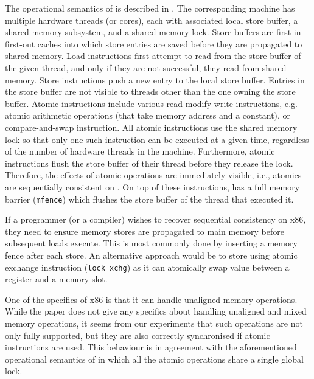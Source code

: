 The operational semantics of \xtso is described in .
The corresponding machine has multiple hardware threads (or cores), each with
associated local store buffer, a shared memory subsystem, and a shared memory
lock.
Store buffers are first-in-first-out caches into which store entries are saved
before they are propagated to shared memory.
Load instructions first attempt to read from the store buffer of the given
thread, and only if they are not successful, they read from shared memory.
Store instructions push a new entry to the local store buffer.
Entries in the store buffer are not visible to threads other than the one
owning the store buffer.
Atomic instructions include various read-modify-write instructions, e.g. atomic
arithmetic operations (that take memory address and a constant),
or compare-and-swap instruction.
All atomic instructions use the shared memory lock so that only one such
instruction can be executed at a given time, regardless of the number of
hardware threads in the machine.
Furthermore, atomic instructions flush the store buffer of their thread before
they release the lock.
Therefore, the effects of atomic operations are immediately visible, i.e.,
atomics are sequentially consistent on \xtso.
On top of these instructions, \xtso has a full memory barrier (\texttt{mfence})
which flushes the store buffer of the thread that executed it.

If a programmer (or a compiler) wishes to recover sequential consistency on
x86, they need to ensure memory stores are propagated to main memory before
subsequent loads execute.
This is most commonly done by inserting a memory fence after each store.
An alternative approach would be to store using atomic exchange instruction
(\texttt{lock xchg}) as it can atomically swap value between a register and a
memory slot.

One of the specifics of x86 is that it can handle unaligned memory
operations.
While the \xtso paper does not give any specifics about handling unaligned and
mixed memory operations,
it seems from our experiments that such operations are not only fully supported, but they are also correctly synchronised if
atomic instructions are used.
This behaviour is in agreement with the aforementioned operational semantics of \xtso in
which all the atomic operations share a single global lock.

